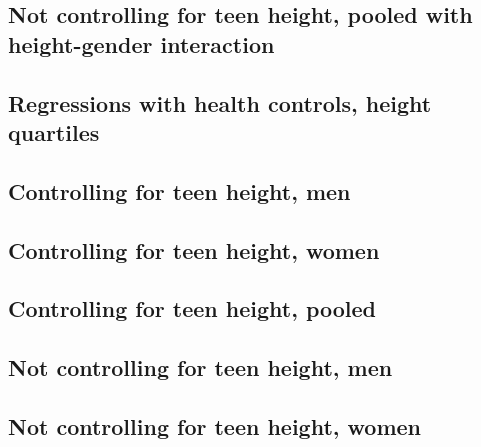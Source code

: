 \documentclass{article}
\begin{document}
\begin{landscape}
\subsection{Not controlling for teen height, pooled with height-gender interaction}

\end{landscape}


\begin{landscape}
\section{Regressions with health controls, height quartiles}
\subsection{Controlling for teen height, men}

\end{landscape}

\begin{landscape}
\subsection{Controlling for teen height, women}

\end{landscape}

\begin{landscape}
\subsection{Controlling for teen height, pooled}

\end{landscape}

\begin{landscape}
\subsection{Not controlling for teen height, men}

\end{landscape}

\begin{landscape}
\subsection{Not controlling for teen height, women}

\end{landscape}
\end{document}

